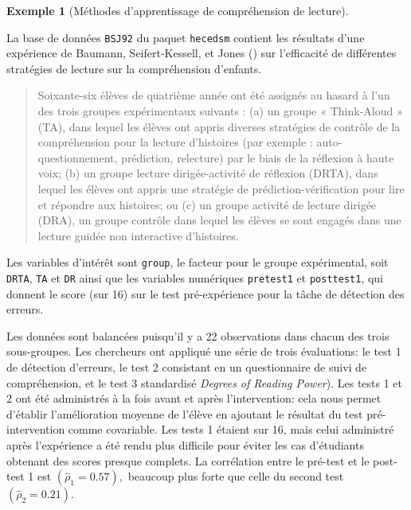 \documentclass[
  11pt,
  letterpaper,
]{scrbook}
\theoremstyle{plain}
\theoremstyle{plain}
\theoremstyle{definition}
\newtheorem{example}{Exemple}[chapter]
\theoremstyle{definition}
\theoremstyle{remark}
\begin{document}
\begin{example}[Méthodes d'apprentissage de compréhension de
lecture]\protect\hypertarget{exm-teaching-baumann}{}\label{exm-teaching-baumann}

La base de données \texttt{BSJ92} du paquet \texttt{hecedsm} contient
les résultats d'une expérience de Baumann, Seifert-Kessell, et Jones
() sur l'efficacité de différentes
stratégies de lecture sur la compréhension d'enfants.

\begin{quote}
Soixante-six élèves de quatrième année ont été assignés au hasard à l'un
des trois groupes expérimentaux suivants : (a) un groupe « Think-Aloud »
(TA), dans lequel les élèves ont appris diverses stratégies de contrôle
de la compréhension pour la lecture d'histoires (par exemple :
auto-questionnement, prédiction, relecture) par le biais de la réflexion
à haute voix; (b) un groupe lecture dirigée-activité de réflexion
(DRTA), dans lequel les élèves ont appris une stratégie de
prédiction-vérification pour lire et répondre aux histoires; ou (c) un
groupe activité de lecture dirigée (DRA), un groupe contrôle dans lequel
les élèves se sont engagés dans une lecture guidée non interactive
d'histoires.
\end{quote}

Les variables d'intérêt sont \texttt{group}, le facteur pour le groupe
expérimental, soit \texttt{DRTA}, \texttt{TA} et \texttt{DR} ainsi que
les variables numériques \texttt{pretest1} et \texttt{posttest1}, qui
donnent le score (sur 16) sur le test pré-expérience pour la tâche de
détection des erreurs.

Les données sont balancées puisqu'il y a 22 observations dans chacun des
trois sous-groupes. Les chercheurs ont appliqué une série de trois
évaluations: le test 1 de détection d'erreurs, le test 2 consistant en
un questionnaire de suivi de compréhension, et le test 3 standardisé
\emph{Degrees of Reading Power}). Les tests 1 et 2 ont été administrés à
la fois avant et après l'intervention: cela nous permet d'établir
l'amélioration moyenne de l'élève en ajoutant le résultat du test
pré-intervention comme covariable. Les tests 1 étaient sur 16, mais
celui administré après l'expérience a été rendu plus difficile pour
éviter les cas d'étudiants obtenant des scores presque complets. La
corrélation entre le pré-test et le post-test 1 est
\((\widehat{\rho}_1=0.57),\) beaucoup plus forte que celle du second
test \((\widehat{\rho}_2=0.21).\)

\end{example}
\end{document}

